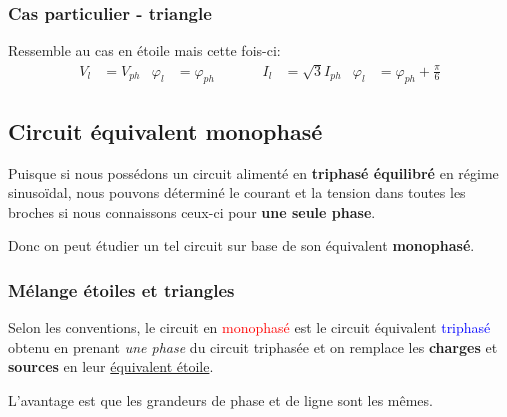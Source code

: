 \documentclass{report}
\begin{document}
\subsubsection{Cas particulier - triangle}
Ressemble au cas en étoile mais cette fois-ci:
\begin{align*}
V_l &= V_{ph} & \varphi_l &= \varphi_{ph}& &\quad & I_l &= \sqrt{3} I_{ph} & \varphi_l &= \varphi_{ph} + \frac{\pi}{6}
\end{align*}


\subsection{Circuit équivalent monophasé}
Puisque si nous possédons un circuit alimenté en \textbf{triphasé équilibré} en régime sinusoïdal, nous pouvons déterminé le courant et la tension dans toutes les broches si nous connaissons ceux-ci pour \textbf{une seule phase}.\par
Donc on peut étudier un tel circuit sur base de son équivalent \textbf{monophasé}.

\subsubsection{Mélange étoiles et triangles}
Selon les conventions, le circuit en \textcolor{red}{monophasé} est le circuit équivalent \textcolor{blue}{triphasé} obtenu en prenant \textit{une phase} du circuit triphasée et on remplace les \textbf{charges} et \textbf{sources} en leur \underline{équivalent étoile}.\par
L'avantage est que les grandeurs de phase et de ligne sont les mêmes.
\end{document}
